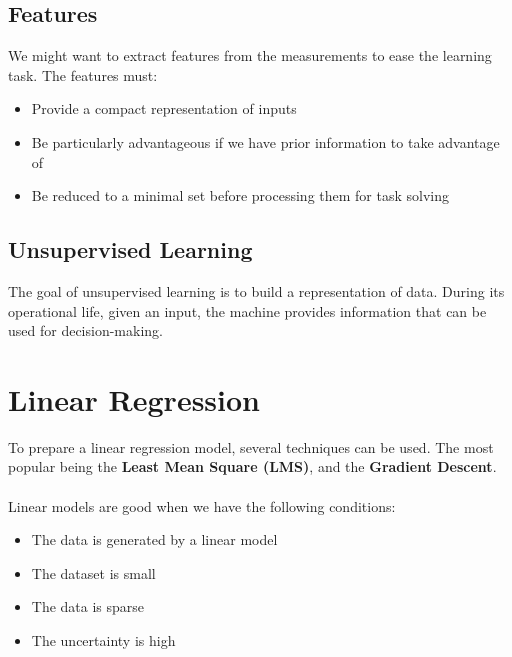 \documentclass{article}
\begin{document}
\subsection{Features}
We might want to extract features from the measurements to ease the learning task. The features must:
\begin{itemize}
	\item Provide a compact representation of inputs
	\item Be particularly advantageous if we have prior information to take advantage of
	\item Be reduced to a minimal set before processing them for task solving
\end{itemize}

\subsection{Unsupervised Learning}
The goal of unsupervised learning is to build a representation of data. During its operational life, given an input, the machine provides information that can be used for decision-making.

\section{Linear Regression}
To prepare a linear regression model, several techniques can be used. The most popular being the \textbf{Least Mean Square (LMS)}, and the \textbf{Gradient Descent}. \\ \\
Linear models are good when we have the following conditions:
\begin{itemize}
	\item The data is generated by a linear model
	\item The dataset is small
	\item The data is sparse
	\item The uncertainty is high
\end{itemize}
\end{document}

